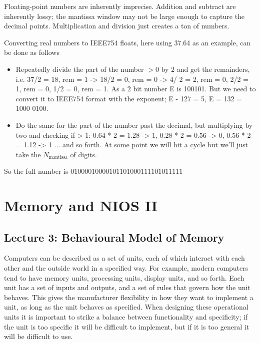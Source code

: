 \documentclass[../notes.tex]{subfiles}
\begin{document}
\begin{definition}
	Floating-point numbers are inherently imprecise. Addition and subtract are inherently lossy; the mantissa window may not be large enough to capture the decimal points. Multiplication and division just creates a ton of numbers.

	Converting real numbers to IEEE754 floats, here using 37.64 as an example, can be done as follows
	\begin{itemize}
		\item Repeatedly divide the part of the number $ >0 $ by $ 2 $ and get the remainders, i.e. 37/2 = 18, rem = 1 -> 18/2 = 0, rem = 0 -> 4/ 2 = 2, rem = 0, 2/2 = 1, rem = 0, 1/2 = 0, rem = 1. As a 2 bit number E is 100101. But we need to convert it to IEEE754 format with the exponent; E - 127 = 5, E = 132 = 1000 0100.
		\item Do the same for the part of the number past the decimal, but multiplying by two and checking if > 1: 0.64 * 2 = 1.28 -> 1, 0.28 * 2 = 0.56 -> 0, 0.56 * 2 = 1.12 -> 1 ... and so forth. At some point we will hit a cycle but we'll just take the $ N_{\text{mantissa}} $ of digits.
	\end{itemize}

	So the full number is $  0 1000 0100 0010 1101 0001 1110 1011 111 $
\end{definition}


\section{Memory and NIOS II}


\subsection{Lecture 3: Behavioural Model of Memory}


Computers can be described as a set of units, each of which interact with each other and the outside world in a specified way.
For example, modern computers tend to have memory units, processing units, display units, and so forth.
Each unit has a set of inputs and outputs, and a set of rules that govern how the unit behaves.
This gives the manufacturer flexibility in how they want to implement a unit, as long as the unit behaves as specified.
When designing these operational units it is important to strike a balance between functionality and specificity; if the unit is too specific it will be difficult to implement, but if it is too general it will be difficult to use.
\end{document}
